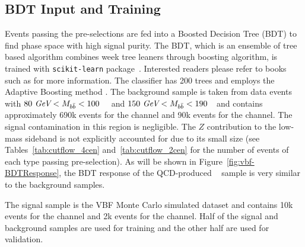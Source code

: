 \label{sec:vbf-bdt}

\subsection{BDT Input and Training}
Events passing the pre-selections are fed into a Boosted Decision Tree (BDT) to find phase space with high signal purity.
The BDT, which is an ensemble of tree based algorithm combines week tree leaners through boosting algorithm, is trained with \texttt{scikit-learn} package~\cite{scikit-learn}. Interested readers please refer to books such as \cite{BDTBOOK} for more information.
The classifier has 200 trees and employs the Adaptive Boosting method \cite{adaboost}.
The background sample is taken from data events with $80~\textit{GeV} < M_{b\bar{b}} <100$~\GeV~
and $150~\textit{GeV}<M_{b\bar{b}}<190$~\GeV~and contains approximately 690k events for
the \fourcentral channel and 90k events for the \twocentral channel.
The signal contamination in this region is negligible.
The $Z$ contribution to the low-mass sideband is not explicitly accounted
for due to its small size (see Tables~\ref{tab:cutflow_4cen}
and~\ref{tab:cutflow_2cen} for the number of events of each type passing pre-selection).
As will be shown in Figure~\ref{fig:vbf-BDTResponse},
the BDT response of the QCD-produced \zjets~ sample is very similar to the background samples. 

The signal sample is the VBF Monte Carlo simulated dataset and
contains 10k events for the \fourcentral channel and 2k events for
the \twocentral channel.  Half of the signal and background samples are
used for training and the other half are used for validation.

